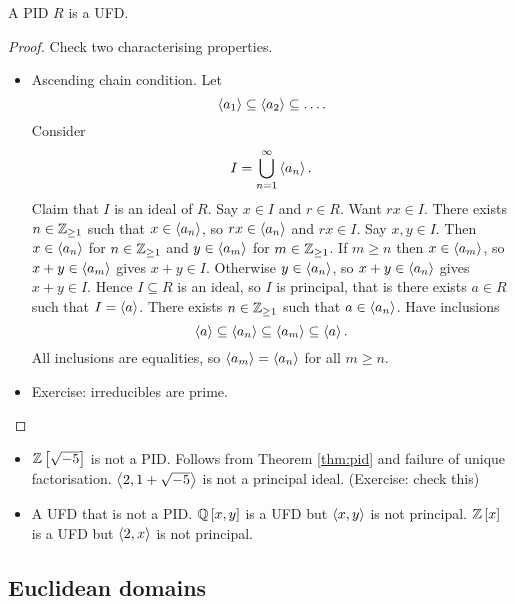 \begin{theorem}
\label{thm:pid}
A PID $ R $ is a UFD.
\end{theorem}

\begin{proof}
Check two characterising properties.
\begin{itemize}
\item Ascending chain condition. Let
$$ \left\langle a_1 \right\rangle \subseteq \left\langle a_2 \right\rangle \subseteq \dots. $$
Consider
$$ I = \bigcup_{n = 1}^\infty \left\langle a_n \right\rangle. $$
Claim that $ I $ is an ideal of $ R $. Say $ x \in I $ and $ r \in R $. Want $ rx \in I $. There exists $ n \in \mathbb{Z}_{\ge 1} $ such that $ x \in \left\langle a_n \right\rangle $, so $ rx \in \left\langle a_n \right\rangle $ and $ rx \in I $. Say $ x, y \in I $. Then $ x \in \left\langle a_n \right\rangle $ for $ n \in \mathbb{Z}_{\ge 1} $ and $ y \in \left\langle a_m \right\rangle $ for $ m \in \mathbb{Z}_{\ge 1} $. If $ m \ge n $ then $ x \in \left\langle a_m \right\rangle $, so $ x + y \in \left\langle a_m \right\rangle $ gives $ x + y \in I $. Otherwise $ y \in \left\langle a_n \right\rangle $, so $ x + y \in \left\langle a_n \right\rangle $ gives $ x + y \in I $. Hence $ I \subseteq R $ is an ideal, so $ I $ is principal, that is there exists $ a \in R $ such that $ I = \left\langle a \right\rangle $. There exists $ n \in \mathbb{Z}_{\ge 1} $ such that $ a \in \left\langle a_n \right\rangle $. Have inclusions
$$ \left\langle a \right\rangle \subseteq \left\langle a_n \right\rangle \subseteq \left\langle a_m \right\rangle \subseteq \left\langle a \right\rangle. $$
All inclusions are equalities, so $ \left\langle a_m \right\rangle = \left\langle a_n \right\rangle $ for all $ m \ge n $.
\item Exercise: irreducibles are prime.
\end{itemize}
\end{proof}

\begin{remark*}
\hfill
\begin{itemize}
\item $ \mathbb{Z}\left[ \sqrt{-5} \right] $ is not a PID. Follows from Theorem \ref{thm:pid} and failure of unique factorisation. $ \left\langle 2, 1 + \sqrt{-5} \right\rangle $ is not a principal ideal. (Exercise: check this)
\item A UFD that is not a PID. $ \mathbb{Q}\left[ x, y \right] $ is a UFD but $ \left\langle x, y \right\rangle $ is not principal. $ \mathbb{Z}\left[ x \right] $ is a UFD but $ \left\langle 2, x \right\rangle $ is not principal.
\end{itemize}
\end{remark*}

\pagebreak

\subsection{Euclidean domains}


